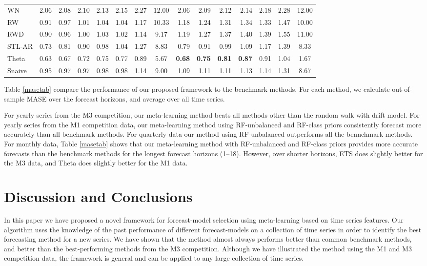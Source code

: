 \documentclass[11pt,a4paper,]{article}
\theoremstyle{definition}
\theoremstyle{definition}
\theoremstyle{definition}
\theoremstyle{remark}
\begin{document}
\begin{table}[!htbp]
\begin{tabular}{lrrrrrrcrrrrrrc}
WN &  2.06 &  2.08 &  2.10 &  2.13& 2.15 &  2.27& 12.00 & 2.06  & 2.09  & 2.12  & 2.14 &  2.18&  2.28&  12.00\\ 
RW & 0.91  &  0.97 &  1.01 &  1.04&  1.04&  1.17& 10.33 & 1.18  & 1.24  & 1.31  & 1.34 &  1.33& 1.47 & 10.00 \\ 
RWD & 0.90  & 0.96  & 1.00  & 1.03 &  1.02& 1.14 &9.17  &  1.19 & 1.27  & 1.37  &1.40  &  1.39& 1.55 & 11.00 \\ 
STL-AR &  0.73 &  0.81 &  0.90 &  0.98& 1.04 &  1.27& 8.83 &0.79   &  0.91 &  0.99 &  1.09& 1.17 & 1.39 & 8.33 \\ 
Theta & 0.63  & 0.67  & 0.72  & 0.75 &  0.77& 0.89 &  5.67& \bf{0.68}  &  \bf{0.75} & \bf{0.81}  & \bf{0.87} &  0.91& 1.04 &  1.67\\ 
Snaive &  0.95 &  0.97 &  0.97 &  0.98& 0.98 &  1.14& 9.00 &1.09   &  1.11 &  1.11 &  1.13& 1.14 & 1.31 & 8.67 \\ \hline
\end{tabular}
\end{table}

Table \ref{masetab} compare the performance of our proposed framework to
the benchmark methods. For each method, we calculate out-of-sample MASE
over the forecast horizons, and average over all time series.

For yearly series from the M3 competition, our meta-learning method
beats all methods other than the random walk with drift model. For
yearly series from the M1 competition data, our meta-learning method
using RF-unbalanced and RF-class priors consistently forecast more
accurately than all benchmark methods. For quarterly data our method
using RF-unbalanced outperforms all the bennchmark methods. For monthly
data, Table \ref{masetab} shows that our meta-learning method with
RF-unbalanced and RF-class priors provides more accurate forecasts than
the benchmark methods for the longest forecast horizons (1--18).
However, over shorter horizons, ETS does slightly better for the M3
data, and Theta does slightly better for the M1 data.

\section{Discussion and Conclusions}\label{discussion}

In this paper we have proposed a novel framework for forecast-model
selection using meta-learning based on time series features. Our
algorithm uses the knowledge of the past performance of different
forecast-models on a collection of time series in order to identify the
best forecasting method for a new series. We have shown that the method
almost always performs better than common benchmark methods, and better
than the best-performing methods from the M3 competition. Although we
have illustrated the method using the M1 and M3 competition data, the
framework is general and can be applied to any large collection of time
series.
\end{document}
